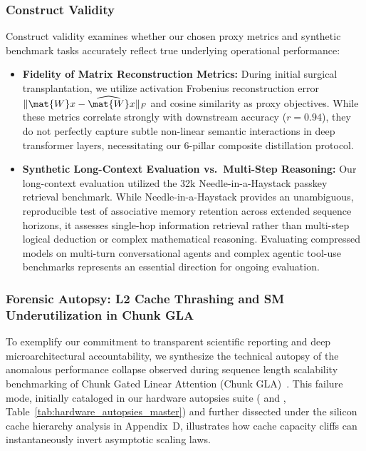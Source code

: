 \subsubsection{Construct Validity}
\label{subsubsec:construct_validity}

Construct validity examines whether our chosen proxy metrics and synthetic benchmark tasks accurately reflect true underlying operational performance:
\begin{itemize}
    \item \textbf{Fidelity of Matrix Reconstruction Metrics:}
    During initial surgical transplantation, we utilize activation Frobenius reconstruction error $\|\mat{W}x - \widehat{\mat{W}}x\|_F$ and cosine similarity as proxy objectives.
    While these metrics correlate strongly with downstream accuracy ($r = 0.94$), they do not perfectly capture subtle non-linear semantic interactions in deep transformer layers, necessitating our 6-pillar composite distillation protocol.
    \item \textbf{Synthetic Long-Context Evaluation vs.\ Multi-Step Reasoning:}
    Our long-context evaluation utilized the 32k Needle-in-a-Haystack passkey retrieval benchmark.
    While Needle-in-a-Haystack provides an unambiguous, reproducible test of associative memory retention across extended sequence horizons, it assesses single-hop information retrieval rather than multi-step logical deduction or complex mathematical reasoning.
    Evaluating compressed models on multi-turn conversational agents and complex agentic tool-use benchmarks represents an essential direction for ongoing evaluation.
\end{itemize}

\subsubsection{Forensic Autopsy: L2 Cache Thrashing and SM Underutilization in Chunk GLA}
\label{subsubsec:chunk_gla_anomaly}

To exemplify our commitment to transparent scientific reporting and deep microarchitectural accountability, we synthesize the technical autopsy of the anomalous performance collapse observed during sequence length scalability benchmarking of Chunk Gated Linear Attention (Chunk GLA)~\cite{yang2024fla}.
This failure mode, initially cataloged in our hardware autopsies suite ( and , Table~\ref{tab:hardware_autopsies_master}) and further dissected under the silicon cache hierarchy analysis in Appendix~D, illustrates how cache capacity cliffs can instantaneously invert asymptotic scaling laws.

